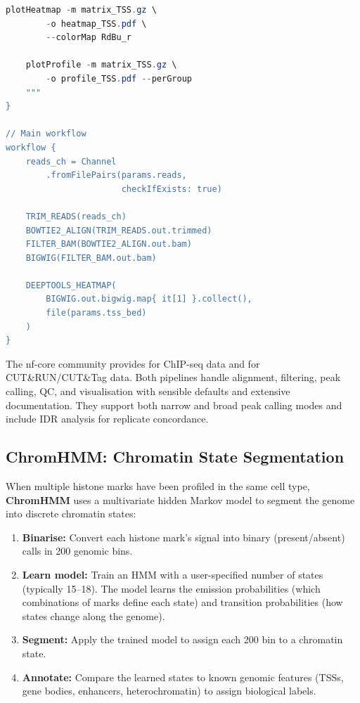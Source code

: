 \begin{lstlisting}[language=Java, caption={Nextflow DSL2 workflow for ChIP-seq/CUT\&Tag analysis.}, label={lst:histones:nextflow}]
    plotHeatmap -m matrix_TSS.gz \
        -o heatmap_TSS.pdf \
        --colorMap RdBu_r

    plotProfile -m matrix_TSS.gz \
        -o profile_TSS.pdf --perGroup
    """
}

// Main workflow
workflow {
    reads_ch = Channel
        .fromFilePairs(params.reads,
                       checkIfExists: true)

    TRIM_READS(reads_ch)
    BOWTIE2_ALIGN(TRIM_READS.out.trimmed)
    FILTER_BAM(BOWTIE2_ALIGN.out.bam)
    BIGWIG(FILTER_BAM.out.bam)

    DEEPTOOLS_HEATMAP(
        BIGWIG.out.bigwig.map{ it[1] }.collect(),
        file(params.tss_bed)
    )
}
\end{lstlisting}

\begin{tipbox}
The nf-core community provides  for ChIP-seq data and  for CUT\&RUN/CUT\&Tag data. Both pipelines handle alignment, filtering, peak calling, QC, and visualisation with sensible defaults and extensive documentation. They support both narrow and broad peak calling modes and include IDR analysis for replicate concordance.
\end{tipbox}

\subsection{ChromHMM: Chromatin State Segmentation}
\label{subsec:histones:chromhmm}

When multiple histone marks have been profiled in the same cell type, \textbf{ChromHMM} uses a multivariate hidden Markov model to segment the genome into discrete chromatin states:

\begin{enumerate}[itemsep=2pt]
  \item \textbf{Binarise:} Convert each histone mark's signal into binary (present/absent) calls in 200\basepair{} genomic bins.
  \item \textbf{Learn model:} Train an HMM with a user-specified number of states (typically 15--18). The model learns the emission probabilities (which combinations of marks define each state) and transition probabilities (how states change along the genome).
  \item \textbf{Segment:} Apply the trained model to assign each 200\basepair{} bin to a chromatin state.
  \item \textbf{Annotate:} Compare the learned states to known genomic features (TSSs, gene bodies, enhancers, heterochromatin) to assign biological labels.
\end{enumerate}

